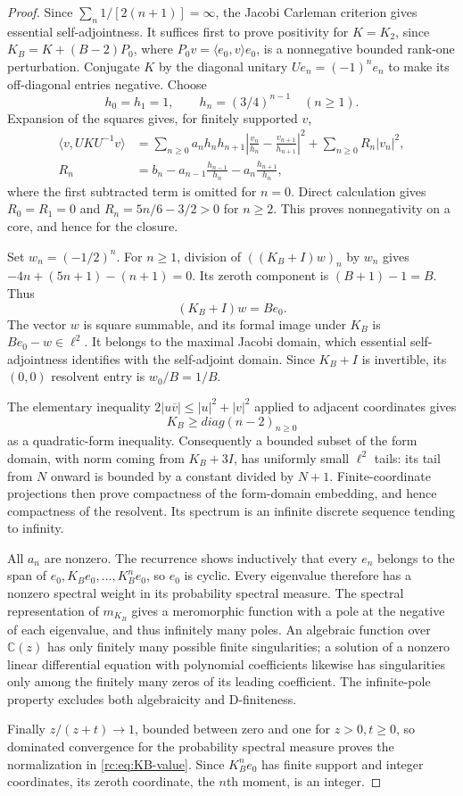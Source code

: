 \documentclass[11pt,a4paper]{article}
\theoremstyle{definition}
\theoremstyle{remark}
\theoremstyle{plain}
\numberwithin{equation}{section}
\def\operatorname#1{#1}\def\mathrm#1{#1}}
\providecommand{\rcdiag}{\operatorname{diag}}
\providecommand{\rcC}{\mathbb C}
\begin{document}
\begin{proof}
Since $\sum_n1/[2(n+1)]=\infty$, the Jacobi Carleman criterion gives
essential self-adjointness.  It suffices first to prove positivity for
$K=K_2$, since $K_B=K+(B-2)P_0$, where
$P_0v=\langle e_0,v\rangle e_0$, is a nonnegative bounded rank-one
perturbation.  Conjugate $K$ by the diagonal unitary $Ue_n=(-1)^ne_n$
to make its off-diagonal entries negative.  Choose
\[
 h_0=h_1=1,\qquad h_n=(3/4)^{n-1}\quad(n\ge1).
\]
Expansion of the squares gives, for finitely supported $v$,
\begin{align*}
 \langle v,UKU^{-1}v\rangle
 &=\sum_{n\ge0}a_nh_nh_{n+1}
       \left|\frac{v_n}{h_n}-\frac{v_{n+1}}{h_{n+1}}\right|^2
   +\sum_{n\ge0}R_n|v_n|^2,\\
 R_n&=b_n-a_{n-1}\frac{h_{n-1}}{h_n}
                -a_n\frac{h_{n+1}}{h_n},
\end{align*}
where the first subtracted term is omitted for $n=0$.  Direct calculation
gives $R_0=R_1=0$ and
$R_n=5n/6-3/2>0$ for $n\ge2$.  This proves nonnegativity on a core,
and hence for the closure.

Set $w_n=(-1/2)^n$.  For $n\ge1$, division of $((K_B+I)w)_n$ by
$w_n$ gives $-4n+(5n+1)-(n+1)=0$.  Its zeroth component is
$(B+1)-1=B$.  Thus
\[
 (K_B+I)w=Be_0.
\]
The vector $w$ is square summable, and its formal image under $K_B$ is
$Be_0-w\in\ell^2$.  It belongs to the maximal Jacobi domain, which
essential self-adjointness identifies with the self-adjoint domain.
Since $K_B+I$ is invertible, its $(0,0)$ resolvent entry is $w_0/B=1/B$.

The elementary inequality $2\lvert u\overline v\rvert\le|u|^2+|v|^2$
applied to adjacent coordinates gives
\[
 K_B\ge\rcdiag(n-2)_{n\ge0}
\]
as a quadratic-form inequality.  Consequently a bounded subset of the
form domain, with norm coming from $K_B+3I$, has uniformly small
$\ell^2$ tails: its tail from $N$ onward is bounded by a constant
divided by $N+1$.  Finite-coordinate projections then prove compactness
of the form-domain embedding, and hence compactness of the resolvent.
Its spectrum is an infinite discrete sequence tending to infinity.

All $a_n$ are nonzero.  The recurrence shows inductively that every
$e_n$ belongs to the span of $e_0,K_Be_0,\ldots,K_B^ne_0$, so $e_0$
is cyclic.  Every eigenvalue therefore has a nonzero spectral weight
in its probability spectral measure.  The spectral representation of
$m_{K_B}$ gives a meromorphic function with a pole at the negative of
each eigenvalue, and thus infinitely many poles.  An algebraic function
over $\rcC(z)$ has only finitely many possible finite singularities;
a solution of a nonzero linear differential equation with polynomial
coefficients likewise has singularities only among the finitely many
zeros of its leading coefficient.  The infinite-pole property excludes
both algebraicity and D-finiteness.

Finally $z/(z+t)\to1$, bounded between zero and one for $z>0,t\ge0$,
so dominated convergence for the probability spectral measure proves
the normalization in \eqref{rc:eq:KB-value}.  Since $K_B^ne_0$ has
finite support and integer coordinates, its zeroth coordinate, the
$n$th moment, is an integer.
\end{proof}
\end{document}
